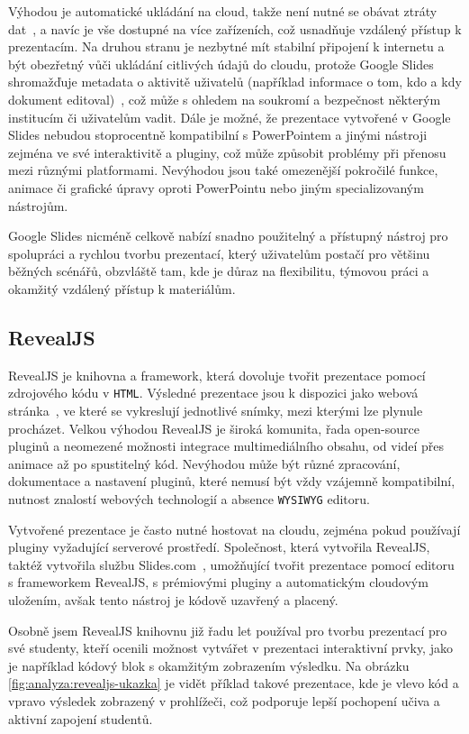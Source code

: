 Výhodou je automatické ukládání na cloud, takže není nutné se obávat ztráty dat~\cite{slides}, a navíc je vše dostupné na více zařízeních, což usnadňuje vzdálený přístup k prezentacím. 
Na druhou stranu je nezbytné mít stabilní připojení k internetu a být obezřetný vůči ukládání citlivých údajů do cloudu, protože Google Slides shromažďuje metadata o aktivitě uživatelů (například informace o tom, kdo a kdy dokument editoval)~\cite{google_terms}, což může s ohledem na soukromí a bezpečnost některým institucím či uživatelům vadit. 
Dále je možné, že prezentace vytvořené v Google Slides nebudou stoprocentně kompatibilní s PowerPointem a jinými nástroji zejména ve své interaktivitě a pluginy, což může způsobit problémy při přenosu mezi různými platformami. 
Nevýhodou jsou také omezenější pokročilé funkce, animace či grafické úpravy oproti PowerPointu nebo jiným specializovaným nástrojům. 

Google Slides nicméně celkově nabízí snadno použitelný a přístupný nástroj pro spolupráci a rychlou tvorbu prezentací, který uživatelům postačí pro většinu běžných scénářů, obzvláště tam, kde je důraz na flexibilitu, týmovou práci a okamžitý vzdálený přístup k materiálům.


\subsection{RevealJS}\label{text:revealjs}

RevealJS je knihovna a framework, která dovoluje tvořit prezentace pomocí zdrojového kódu v \texttt{HTML}. 
Výsledné prezentace jsou k dispozici jako webová stránka~\cite{revealjs}, ve které se vykreslují jednotlivé snímky, mezi kterými lze plynule procházet. 
Velkou výhodou RevealJS je široká komunita, řada open-source pluginů a neomezené možnosti integrace multimediálního obsahu, od videí přes animace až po spustitelný kód. 
Nevýhodou může být různé zpracování, dokumentace a nastavení pluginů, které nemusí být vždy vzájemně kompatibilní, nutnost znalostí webových technologií a absence \texttt{WYSIWYG} editoru. 

Vytvořené prezentace je často nutné hostovat na cloudu, zejména pokud používají pluginy vyžadující serverové prostředí.
Společnost, která vytvořila RevealJS, taktéž vytvořila službu Slides.com~\cite{revealjs, slidescom}, umožňující tvořit prezentace pomocí editoru s frameworkem RevealJS, s prémiovými pluginy a automatickým cloudovým uložením, avšak tento nástroj je kódově uzavřený a placený. 

Osobně jsem RevealJS knihovnu již řadu let používal pro tvorbu prezentací pro své studenty, kteří ocenili možnost vytvářet v prezentaci interaktivní prvky, jako je například kódový blok s okamžitým zobrazením výsledku. 
Na obrázku \ref{fig:analyza:revealjs-ukazka} je vidět příklad takové prezentace, kde je vlevo kód a vpravo výsledek zobrazený v prohlížeči, což podporuje lepší pochopení učiva a aktivní zapojení studentů. 

